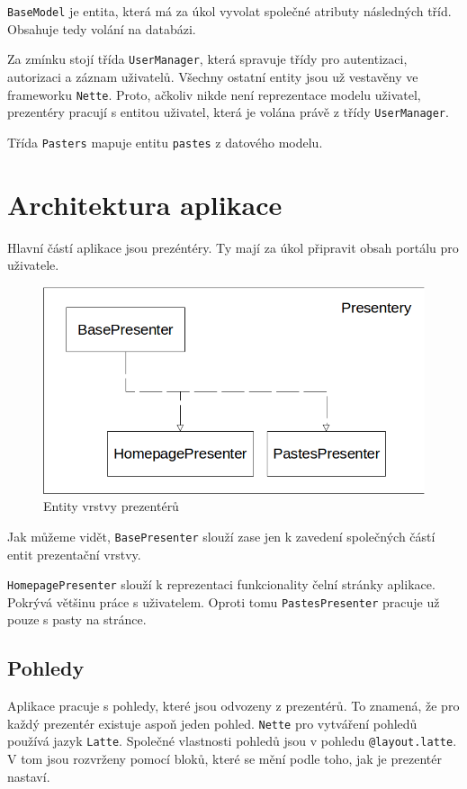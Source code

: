 \documentclass[a4paper,10pt]{report}
\begin{document}
\texttt{BaseModel} je entita, která má za úkol vyvolat společné atributy následných tříd. Obsahuje tedy volání na databázi.

Za zmínku stojí třída \texttt{UserManager}, která spravuje třídy pro autentizaci, autorizaci a záznam uživatelů. Všechny ostatní entity jsou už vestavěny ve frameworku \texttt{Nette}. Proto, ačkoliv nikde není reprezentace modelu uživatel, prezentéry pracují s entitou uživatel, která je volána právě z třídy \texttt{UserManager}.

Třída \texttt{Pasters} mapuje entitu \texttt{pastes} z datového modelu.

\section{Architektura aplikace}

Hlavní částí aplikace jsou prezéntéry. Ty mají za úkol připravit obsah portálu pro uživatele.

\begin{figure}[H]
  \centering
	\includegraphics[scale=0.5]{presentery.png} 
  \caption{Entity vrstvy prezentérů}
  \label{presenter}
\end{figure}

Jak můžeme vidět, \texttt{BasePresenter} slouží zase jen k zavedení společných částí entit prezentační vrstvy.

\texttt{HomepagePresenter} slouží k reprezentaci funkcionality čelní stránky aplikace. Pokrývá většinu práce s uživatelem. Oproti tomu \texttt{PastesPresenter} pracuje už pouze s pasty na stránce.

\subsection{Pohledy}

Aplikace pracuje s pohledy, které jsou odvozeny z prezentérů. To znamená, že pro každý prezentér existuje aspoň jeden pohled. \texttt{Nette} pro vytváření pohledů používá jazyk \texttt{Latte}. Společné vlastnosti pohledů jsou v pohledu \texttt{@layout.latte}. V tom jsou rozvrženy pomocí bloků, které se mění podle toho, jak je prezentér nastaví.
\end{document}
